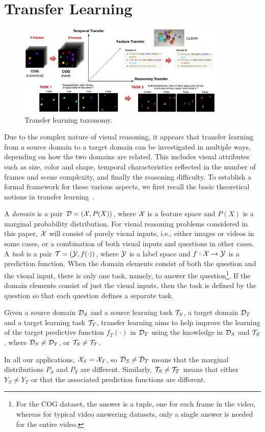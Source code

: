 \section{Transfer Learning}
\label{sec:transfer_learning}
\begin{figure}
	\centering
	\includegraphics[width=0.9\textwidth]{../img/architecture/transfer_taxo}
	\caption{Transfer learning taxonomy.}\label{fig:taskonomy}
\end{figure}
Due to the complex nature of visual reasoning, it appears that
transfer learning from a source domain to a target domain can be investigated in
multiple ways, depending on how the two domains are related. This includes visual attributes such as size, color and shape, temporal characteristics reflected in the number of frames and scene complexity, and finally the reasoning difficulty. 
To establish a formal framework for these various aspects, we first recall the basic theoretical notions in transfer learning~\cite{pan2009survey}.

A \emph{domain} is a pair $\mathcal{D} = (\mathcal{X},P(X))$, where $\mathcal{X}$ is a feature space and $P(X)$ is a marginal probability distribution.
For visual reasoning problems considered in this paper,
$\mathcal{X}$ will consist of purely visual inputs, i.e., either images or videos in some cases, or
a combination of both visual inputs and questions in other cases.
A \emph{task} is a pair $\mathcal{T}= (\mathcal{Y},f(\cdot))$, where $\mathcal{Y}$ is a label space and $f: \mathcal{X} \to \mathcal{Y}$ is a prediction function.
When the domain elements consist of both the question and the visual input, there is only one task, namely, to answer the
question\footnote{%
	For the COG dataset, the answer is a tuple, one for each frame in the video, whereas for typical video answering datasets,
	only a single answer is needed for the entire video.}. %
If the domain elements consist of just the visual inputs, then the task is defined by the question so that each question
defines a separate task.

\begin{definition}
	\label{defn:transfer}
	Given a source domain $\mathcal{D}_S$ and a source learning task $\mathcal{T}_S$, a target domain $\mathcal{D}_T$ and a target learning task $\mathcal{T}_T$, transfer learning aims to help improve the
	learning of the target predictive function $f_T(\cdot)$ in $\mathcal{D}_T$ using the knowledge  in $\mathcal{D}_S$ and $\mathcal{T}_S$, where $\mathcal{D}_S \ne \mathcal{D}_T$, or $\mathcal{T}_S \ne \mathcal{T}_T$.
\end{definition}
In all our applications, $\mathcal{X}_S = \mathcal{X}_T$, so $\mathcal{D}_S \ne \mathcal{D}_T$ means that the marginal distributions $P_S$ and $P_T$ are different.
Similarly, $\mathcal{T}_S \ne \mathcal{T}_T$ means that either $Y_S \ne Y_T$ or that the associated prediction functions are different.

